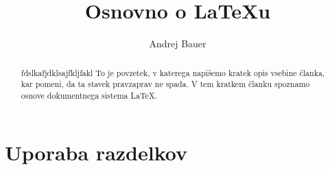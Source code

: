 \documentclass[a4paper]{article}
\begin{document}

\title{Osnovno o {\LaTeX}u}
\author{Andrej Bauer}



\maketitle

%
%

\begin{abstract}
  fdslkafjdklsajfkljfakl
  To je povzetek, v katerega napišemo kratek opis vsebine članka, kar pomeni, da ta stavek
  pravzaprav ne spada. V tem kratkem članku spoznamo osnove dokumentnega sistema {\LaTeX}.
\end{abstract}


\section{Uporaba razdelkov}

\end{document}
